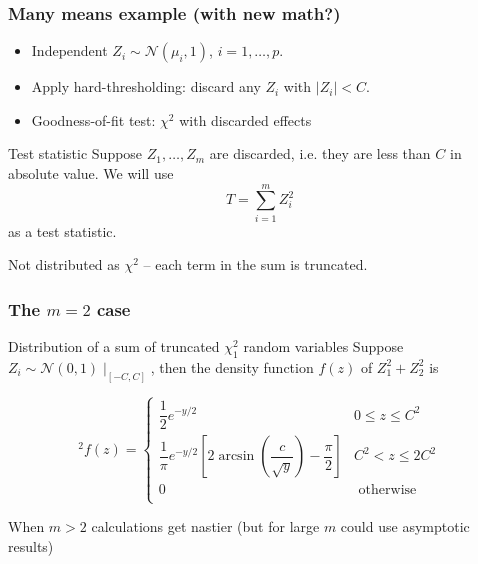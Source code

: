 \documentclass{beamer}
\begin{document}
\begin{frame}
\frametitle{Many means example (with new math?)}

\begin{itemize}
\item Independent $Z_i \sim \mathcal N(\mu_i, 1)$, $i = 1, \ldots, p$.
\item Apply hard-thresholding: discard any $Z_i$ with $|Z_i| < C$.
\item Goodness-of-fit test: $\chi^2$ with discarded effects
\end{itemize}

\begin{block}{Test statistic}
  Suppose $Z_1, \ldots, Z_m$ are discarded, i.e. they are less than $C$ in absolute value. We will use
  \begin{equation*}
    T = \sum_{i=1}^m Z_i^2
  \end{equation*}
  as a test statistic.
\end{block}

Not distributed as $\chi^2$ --  each term in the sum is truncated.

\end{frame}

\begin{frame}
  \frametitle{The $m=2$ case}

\begin{block}{Distribution of a sum of truncated $\chi^2_1$ random variables}
Suppose $Z_i \sim \mathcal N(0, 1) \mid_{[-C, C]}$, then the density function $f(z)$ of $Z_1^2+Z_2^2$ is

\begin{equation*}
 [1 - 2\Phi(-C)]^2 f(z) = 
\begin{cases}
  \dfrac{1}{2}e^{-y/2} & 0 \leq z \leq C^2 \\
  \dfrac{1}{\pi}e^{-y/2}\left[2\arcsin\left(\dfrac{c}{\sqrt{y}}\right)-\dfrac{\pi}{2}\right] & C^2 < z \leq 2C^2 \\
  0 & \text{ otherwise}\\
\end{cases}
\end{equation*}
\end{block}

When $m > 2$ calculations get nastier (but for large $m$ could use asymptotic results)

\end{frame}
\end{document}
